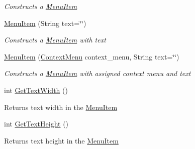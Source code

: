 \begin{DoxyCompactItemize}
\begin{DoxyCompactList}\small\item\em Constructs a \mbox{\hyperlink{class_space_v_i_l_1_1_menu_item}{Menu\+Item}} \end{DoxyCompactList}\item 
\mbox{\hyperlink{class_space_v_i_l_1_1_menu_item_ade5f55fe599f1b5c2d57728f815f4ca5}{Menu\+Item}} (String text=\char`\"{}\char`\"{})
\begin{DoxyCompactList}\small\item\em Constructs a \mbox{\hyperlink{class_space_v_i_l_1_1_menu_item}{Menu\+Item}} with text \end{DoxyCompactList}\item 
\mbox{\hyperlink{class_space_v_i_l_1_1_menu_item_aebcbfeda9a1adfecfe1c788316b5280b}{Menu\+Item}} (\mbox{\hyperlink{class_space_v_i_l_1_1_context_menu}{Context\+Menu}} context\+\_\+menu, String text=\char`\"{}\char`\"{})
\begin{DoxyCompactList}\small\item\em Constructs a \mbox{\hyperlink{class_space_v_i_l_1_1_menu_item}{Menu\+Item}} with assigned context menu and text \end{DoxyCompactList}\item 
\mbox{\label{class_space_v_i_l_1_1_menu_item_ae459b1ee3bbd50feeda3fbd72fc88b3a}} 
int \mbox{\hyperlink{class_space_v_i_l_1_1_menu_item_ae459b1ee3bbd50feeda3fbd72fc88b3a}{Get\+Text\+Width}} ()
\begin{DoxyCompactList}\small\item\em \begin{DoxyReturn}{Returns}
text width in the \mbox{\hyperlink{class_space_v_i_l_1_1_menu_item}{Menu\+Item}} 
\end{DoxyReturn}
\end{DoxyCompactList}\item 
\mbox{\label{class_space_v_i_l_1_1_menu_item_aabeee3bdbc0be8c86c4a28daea1e3f08}} 
int \mbox{\hyperlink{class_space_v_i_l_1_1_menu_item_aabeee3bdbc0be8c86c4a28daea1e3f08}{Get\+Text\+Height}} ()
\begin{DoxyCompactList}\small\item\em \begin{DoxyReturn}{Returns}
text height in the \mbox{\hyperlink{class_space_v_i_l_1_1_menu_item}{Menu\+Item}} 
\end{DoxyReturn}

\end{DoxyCompactList}
\end{DoxyCompactItemize}
